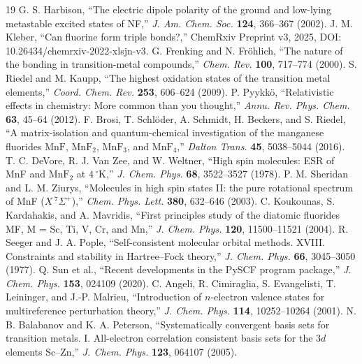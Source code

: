 \documentclass[10pt,twocolumn]{article}
\begin{document}
\begin{thebibliography}{19}
 G. S. Harbison, ``The electric dipole polarity of the ground and low-lying metastable excited states of NF,'' \textit{J. Am. Chem. Soc.} \textbf{124}, 366--367 (2002).
 J. M. Kleber, ``Can fluorine form triple bonds?,'' ChemRxiv Preprint v3, 2025, DOI: 10.26434/chemrxiv-2022-xlsjn-v3.
 G. Frenking and N. Fr\"ohlich, ``The nature of the bonding in transition-metal compounds,'' \textit{Chem. Rev.} \textbf{100}, 717--774 (2000).
 S. Riedel and M. Kaupp, ``The highest oxidation states of the transition metal elements,'' \textit{Coord. Chem. Rev.} \textbf{253}, 606--624 (2009).
 P. Pyykk\"o, ``Relativistic effects in chemistry: More common than you thought,'' \textit{Annu. Rev. Phys. Chem.} \textbf{63}, 45--64 (2012).
 F. Brosi, T. Schl\"oder, A. Schmidt, H. Beckers, and S. Riedel, ``A matrix-isolation and quantum-chemical investigation of the manganese fluorides $\mathrm{MnF}$, $\mathrm{MnF}_2$, $\mathrm{MnF}_3$, and $\mathrm{MnF}_4$,'' \textit{Dalton Trans.} \textbf{45}, 5038--5044 (2016).
 T. C. DeVore, R. J. Van Zee, and W. Weltner, ``High spin molecules: ESR of MnF and $\mathrm{MnF}_2$ at $4\,^\circ$K,'' \textit{J. Chem. Phys.} \textbf{68}, 3522--3527 (1978).
 P. M. Sheridan and L. M. Ziurys, ``Molecules in high spin states II: the pure rotational spectrum of MnF ($X\,^7\Sigma^+$),'' \textit{Chem. Phys. Lett.} \textbf{380}, 632--646 (2003).
 C. Koukounas, S. Kardahakis, and A. Mavridis, ``First principles study of the diatomic fluorides MF, M = Sc, Ti, V, Cr, and Mn,'' \textit{J. Chem. Phys.} \textbf{120}, 11500--11521 (2004).
 R. Seeger and J. A. Pople, ``Self-consistent molecular orbital methods. XVIII. Constraints and stability in Hartree--Fock theory,'' \textit{J. Chem. Phys.} \textbf{66}, 3045--3050 (1977).
 Q. Sun et al., ``Recent developments in the PySCF program package,'' \textit{J. Chem. Phys.} \textbf{153}, 024109 (2020).
 C. Angeli, R. Cimiraglia, S. Evangelisti, T. Leininger, and J.-P. Malrieu, ``Introduction of $n$-electron valence states for multireference perturbation theory,'' \textit{J. Chem. Phys.} \textbf{114}, 10252--10264 (2001).
 N. B. Balabanov and K. A. Peterson, ``Systematically convergent basis sets for transition metals. I. All-electron correlation consistent basis sets for the $3d$ elements Sc--Zn,'' \textit{J. Chem. Phys.} \textbf{123}, 064107 (2005).

\end{thebibliography}
\end{document}
